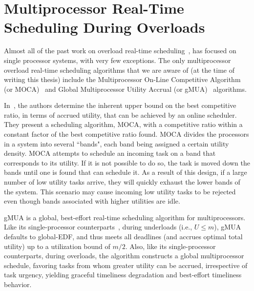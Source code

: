\documentclass[12pt,dvips]{report}
\begin{document}

\section{Multiprocessor Real-Time Scheduling During Overloads}

Almost all of the past work on overload real-time scheduling~\cite{loc86, DASA, cho-thesis06, Li-Thesis, Li04, Li06, cho10}, has focused on single processor systems, with very few exceptions. The only multiprocessor overload real-time scheduling algorithms that we are aware of (at the time of writing this thesis) include the Multiprocessor On-Line Competitive Algorithm (or MOCA)~\cite{MOCA} and Global Multiprocessor Utility Accrual (or gMUA)~\cite{cho-thesis06} algorithms.

In~\cite{MOCA}, the authors determine the inherent upper bound on the best competitive ratio, in terms of accrued utility, that can be achieved by an online scheduler. They present a scheduling algorithm, MOCA, with a competitive ratio within a constant factor of the best competitive ratio found. MOCA divides the processors in a system into several ``bands", each band being assigned a certain utility density. MOCA attempts to schedule an incoming task on a band that corresponds to its utility. If it is not possible to do so, the task is moved down the bands until one is found that can schedule it. As a result of this design, if a large number of low utility tasks arrive, they will quickly exhaust the lower bands of the system. This scenario may cause incoming low utility tasks to be rejected even though bands associated with higher utilities are idle. 

gMUA is a global, best-effort real-time scheduling algorithm for multiprocessors. Like its single-processor counterparts~\cite{loc86, DASA, cho-thesis06, Li-Thesis, Li04, Li06, cho10}, during underloads (i.e., $U \leq m$), gMUA defaults to global-EDF, and thus meets all deadlines (and accrues optimal total utility) up to a utilization bound of $m/2$. Also, like its single-processor counterparts, during overloads, the algorithm constructs a global multiprocessor schedule, favoring tasks from whom greater utility can be accrued, irrespective of task urgency, yielding graceful timeliness degradation and best-effort timeliness behavior. 
\end{document}
